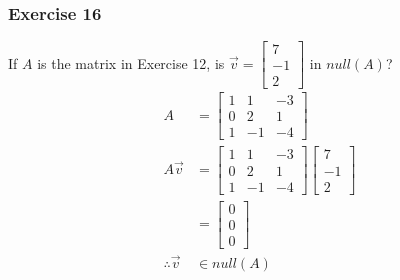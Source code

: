 \documentclass{math}
\begin{document}
\subsubsection*{Exercise 16}
If \( A \) is the matrix in Exercise 12, is \( \vec{v} = \begin{bmatrix}
7 \\ -1 \\ 2\end{bmatrix} \) in \( null(A) \)?
\begin{align*}
  A &= \begin{bmatrix}
    1 & 1 & -3 \\
    0 & 2 & 1 \\
    1 & -1 & -4
  \end{bmatrix} \\
  A\vec{v} &= \begin{bmatrix}
    1 & 1 & -3 \\
    0 & 2 & 1 \\
    1 & -1 & -4
  \end{bmatrix}\begin{bmatrix}7 \\ -1 \\ 2\end{bmatrix} \\
  &= \begin{bmatrix}0 \\ 0 \\ 0\end{bmatrix} \\
  \therefore \vec{v} &\in null(A)
\end{align*}
\end{document}
